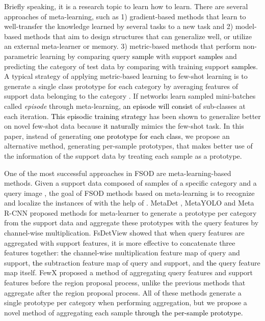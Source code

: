 \documentclass[10pt,twocolumn,letterpaper]{article}
\newcommand{\nj}[1]{\textcolor{black}{#1}}
\begin{document}
\vspace{+0.08cm}
\quad Briefly speaking, it is a research topic to learn how to learn. There are several approaches of meta-learning, such as 1) gradient-based methods \cite{finn2017model, li2018learning} that learn to well-transfer the knowledge learned by several tasks to a new task and 2) model-based methods \cite{munkhdalai2017meta, ravi2016optimization} that aim to design structures that can generalize well, or utilize an external meta-learner or memory. 3) metric-based methods \cite{snell2017prototypical, vinyals2016matching, ren2018meta, yang2021free} that perform non-parametric learning by comparing query \nj{sample} with support \nj{samples} and predicting the category of test data by comparing with training support \nj{samples}. A typical strategy of applying metric-based learning to few-shot learning is to generate a single class prototype for each category by averaging features of support data belonging to the category \cite{snell2017prototypical, vinyals2016matching, sung2018learning}. 
If networks learn sampled mini-batches called \emph{episode} through meta-learning, \nj{an episode will consist} of sub-classes at each iteration. \nj{This episodic training strategy} has been shown to generalize better on novel few-shot data because \nj{it naturally} mimics the few-shot task. In this paper, instead of generating \nj{one prototype for each class}, we propose an alternative method, generating per-sample prototypes, that makes better use of the information of the support data by treating each sample as a prototype.


\vspace{+0.15cm}
\quad One of the most successful approaches in FSOD are meta-learning-based methods. Given a support data  composed of  samples of a specific category and a query image , the goal of FSOD methods based on meta-learning is to recognize and localize the instances of  with the help of . MetaDet \cite{wang2019meta}, MetaYOLO \cite{kang2019few} and Meta R-CNN \cite{yan2019meta} proposed methods for meta-learner to generate a prototype per category from the support data and aggregate these prototypes with the query features by channel-wise multiplication. FsDetView \cite{xiao2020few} showed that when query features are aggregated with support features, it is more effective to concatenate three features together: \nj{the} channel-wise multiplication feature map of query and support, \nj{the} subtraction feature map of query and support, and \nj{the} query feature map itself. FewX \cite{fan2020fsod} proposed a method of aggregating query features and support features before the region proposal process, unlike the previous methods that aggregate after the region proposal process. All of these methods generate a single prototype per category when performing aggregation, but we propose a novel method of aggregating each sample \nj{through the per-sample prototype.}
\end{document}
